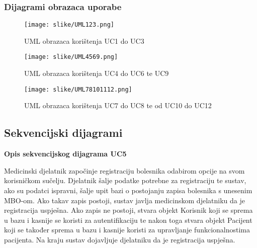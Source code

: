 				\pagebreak
					
				\subsubsection{Dijagrami obrazaca uporabe}
					
				
				
			\begin{figure}[H]
				\texttt{[image: slike/UML123.png]} %
				\centering
				\caption{UML obrazaca korištenja UC1 do UC3}
				\label{fig:uml123}
			\end{figure}
			\begin{figure}[H]
			\texttt{[image: slike/UML4569.png]} %
			\centering
			\caption{UML obrazaca korištenja UC4 do UC6 te UC9}
			\label{fig:um4569}
		\end{figure}		
	
			\begin{figure}[H]
				\texttt{[image: slike/UML78101112.png]} %
				\centering
				\caption{UML obrazaca korištenja UC7 do UC8 te od UC10 do UC12}
				\label{fig:um78101112}
			\end{figure}
			
			\pagebreak
			\subsection{Sekvencijski dijagrami}
				
				
				
				\textbf{Opis sekvencijskog dijagrama UC5}
					\begin{flushleft}
					Medicinski djelatnik započinje registraciju bolesnika odabirom opcije na svom korisničkom sučelju. Djelatnik šalje podatke potrebne za registraciju te sustav, ako su podatci ispravni, šalje upit bazi o postojanju zapisa bolesnika s unesenim MBO-om. Ako takav zapis postoji, sustav javlja medicinskom djelatniku da je registracija uspješna. Ako zapis ne postoji, stvara objekt Korisnik koji se sprema u bazu i kasnije se koristi za autentifikaciju te nakon toga stvara objekt Pacijent koji se također sprema u bazu i kasnije koristi za upravljanje funkcionalnostima pacijenta. Na kraju sustav dojavljuje djelatniku da je registracija uspješna.
				\end{flushleft}
			
